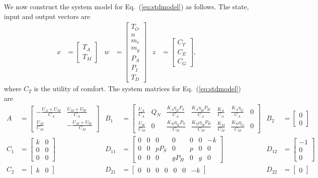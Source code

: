 \documentclass[12pt,letterpaper,twoside]{article}
\newcommand{\eq}[1]{\begin{align*}#1\end{align*}}
\newcommand{\Matrix}[1]{\begin{bmatrix}#1\end{bmatrix}}
\begin{document}
We now construct the system model for Eq.~(\ref{eq:stdmodel}) as follows. The state, input and output vectors are
\eq {
	x &= \Matrix { T_A \\ T_M }
&
	w &= \Matrix {T_O \\ n \\ m_e \\ m_g \\ P_A \\ P_I \\ T_D }
&
	z &= \Matrix { C_T \\ C_E \\ C_G },
}
where $C_T$ is the utility of comfort.
The system matrices for Eq.~(\ref{eq:stdmodel}) are
\eq {
		A &= \Matrix {
			-\frac{U_A+U_M}{C_A} & \frac{U_M+U_W}{C_A} 
		\\
			\frac{U_M}{C_M} & -\frac{U_M+U_W}{C_M} 
		}
	&
		B_1 &= \Matrix { 
			\frac{U_A}{C_A} & Q_N & \frac{K_A \eta_E P_S}{C_A} & \frac{K_A \eta_H P_H}{C_A} & \frac{K_A}{C_A} & \frac{K_A \eta_G}{C_A} & 0
		\\
			\frac{U_W}{C_M} & 0 & \frac{K_M \eta_E P_S}{C_M} & \frac{K_M \eta_H P_H}{C_M} & \frac{K_M}{C_M} & \frac{K_M \eta_G}{C_M} & 0
		}
	&
		B_2 & = \Matrix {
			0
		\\
			0
		}
	\\
		C_1 & = \Matrix {
			k & 0
	\\
			0 & 0
	\\
		 	0 & 0
		}
	&
		D_{11} & = \Matrix {
			0 & 0 & 0 & 0 & 0 & 0 & -k
	\\
			0 & 0 & pP_S & 0 & p & 0 & 0
	\\
		 	0 & 0 & 0 & gP_H & 0 & g & 0
		}
	&
		D_{12} & = \Matrix {
			-1
	\\
			0
	\\
			0
		}
	\\
		C_2 & = \Matrix {
			k & 0
		}
	&
		D_{21} & = \Matrix {
			0 & 0 & 0 & 0 & 0 & 0 & -k
		}
	&
		D_{22} & = \Matrix {
			0
		}
}
\end{document}
